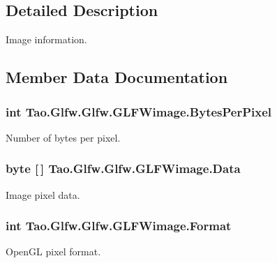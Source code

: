 \subsection{Detailed Description}
Image information. 

\subsection{Member Data Documentation}
\hypertarget{struct_tao_1_1_glfw_1_1_glfw_1_1_g_l_f_wimage_a4a84a6a34530640ba6ecf5f5873f2f4f}{
\subsubsection[{BytesPerPixel}]{\setlength{\rightskip}{0pt plus 5cm}int {\bf Tao.Glfw.Glfw.GLFWimage.BytesPerPixel}}}
\label{struct_tao_1_1_glfw_1_1_glfw_1_1_g_l_f_wimage_a4a84a6a34530640ba6ecf5f5873f2f4f}


Number of bytes per pixel. 

\hypertarget{struct_tao_1_1_glfw_1_1_glfw_1_1_g_l_f_wimage_a6383c214e0e3c8c22b218d4c206143e6}{
\subsubsection[{Data}]{\setlength{\rightskip}{0pt plus 5cm}byte \mbox{[}$\,$\mbox{]} {\bf Tao.Glfw.Glfw.GLFWimage.Data}}}
\label{struct_tao_1_1_glfw_1_1_glfw_1_1_g_l_f_wimage_a6383c214e0e3c8c22b218d4c206143e6}


Image pixel data. 

\hypertarget{struct_tao_1_1_glfw_1_1_glfw_1_1_g_l_f_wimage_a9ac9923b29ca1aeb1f7001a8f457e894}{
\subsubsection[{Format}]{\setlength{\rightskip}{0pt plus 5cm}int {\bf Tao.Glfw.Glfw.GLFWimage.Format}}}
\label{struct_tao_1_1_glfw_1_1_glfw_1_1_g_l_f_wimage_a9ac9923b29ca1aeb1f7001a8f457e894}


OpenGL pixel format. 

